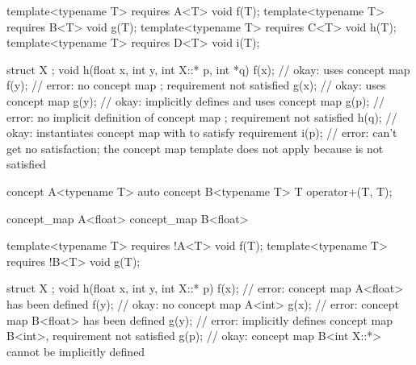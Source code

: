 \documentclass[american]{book}
\begin{document}
\begin{paras}
\begin{codeblock}
template<typename T> requires A<T> void f(T);
template<typename T> requires B<T> void g(T);
template<typename T> requires C<T> void h(T);
template<typename T> requires D<T> void i(T);

struct X { };
void h(float x, int y, int X::* p, int *q) {
  f(x); // okay: uses concept map 
  f(y); // error: no concept map ; requirement not satisfied
  g(x); // okay: uses concept map 
  g(y); // okay: implicitly defines and uses concept map 
  g(p); // error: no implicit definition of concept map ; requirement not satisfied
  h(q); // okay: instantiates concept map  with  to satisfy requirement 
  i(p); // error:  can't get no satisfaction; the concept map template  does not apply because  is not satisfied
}
\end{codeblock}
\addedConcepts{\mbox{\exitexample}}

\pnum 
{}
\addedConcepts{\mbox{\enterexample}}
\begin{codeblock}
concept A<typename T> { }
auto concept B<typename T> { T operator+(T, T); }

concept_map A<float> { }
concept_map B<float> { }

template<typename T> requires !A<T> void f(T);
template<typename T> requires !B<T> void g(T);

struct X { };
void h(float x, int y, int X::* p) {
  f(x); // error: concept map A<float> has been defined
  f(y); // okay: no concept map A<int>
  g(x); // error: concept map B<float> has been defined
  g(y); // error: implicitly defines concept map B<int>, requirement not satisfied
  g(p); // okay: concept map B<int X::*> cannot be implicitly defined
}
\end{codeblock}
\addedConcepts{\mbox{\exitexample}}

\pnum
{} 
\addedZ{(\mbox{\ref{concept.def}})}


\end{paras}
\end{document}
